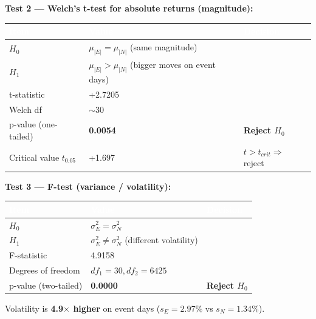 \documentclass[12pt,a4paper]{article}
\begin{document}
\textbf{Test 2 --- Welch's t-test for absolute returns (magnitude):}
\begin{table}[H]
\centering
\begin{tabularx}{\textwidth}{|l|l|X|}
\hline
\rowcolor{hdrbg} \textcolor{white}{\textbf{Item}} & \textcolor{white}{\textbf{Value}} & \textcolor{white}{\textbf{Decision}} \\
\hline
$H_0$ & $\mu_{|E|} = \mu_{|N|}$ (same magnitude) & \\
\hline
\rowcolor{rowalt}
$H_1$ & $\mu_{|E|} > \mu_{|N|}$ (bigger moves on event days) & \\
\hline
t-statistic & +2.7205 & \\
\hline
\rowcolor{rowalt}
Welch df & $\sim$30 & \\
\hline
\rowcolor{sigbg}
p-value (one-tailed) & \textbf{0.0054} & \textbf{Reject $H_0$} \\
\hline
Critical value $t_{0.05}$ & +1.697 & $t > t_{crit} \Rightarrow$ reject \\
\hline
\end{tabularx}
\end{table}

\newpage
\textbf{Test 3 --- F-test (variance / volatility):}
\begin{table}[H]
\centering
\begin{tabularx}{\textwidth}{|l|l|X|}
\hline
\rowcolor{hdrbg} \textcolor{white}{\textbf{Item}} & \textcolor{white}{\textbf{Value}} & \textcolor{white}{\textbf{Decision}} \\
\hline
$H_0$ & $\sigma^2_E = \sigma^2_N$ & \\
\hline
\rowcolor{rowalt}
$H_1$ & $\sigma^2_E \neq \sigma^2_N$ (different volatility) & \\
\hline
F-statistic & 4.9158 & \\
\hline
\rowcolor{rowalt}
Degrees of freedom & $df_1=30, df_2=6425$ & \\
\hline
\rowcolor{sigbg}
p-value (two-tailed) & \textbf{0.0000} & \textbf{Reject $H_0$} \\
\hline
\end{tabularx}
\end{table}

Volatility is \textbf{4.9$\times$ higher} on event days ($s_E = 2.97\%$ vs $s_N = 1.34\%$).
\end{document}
